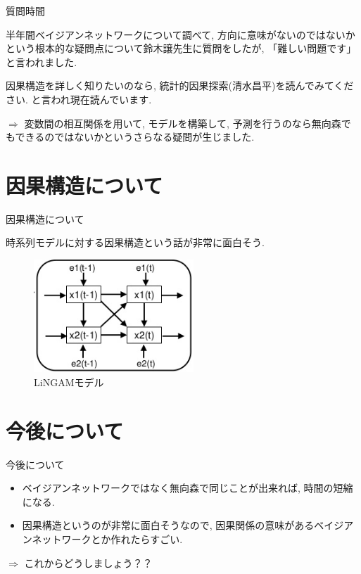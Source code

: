 \documentclass[dvipdfmx]{beamer}
\begin{document}
\begin{frame}{質問時間}

半年間ベイジアンネットワークについて調べて, 方向に意味がないのではないかという根本的な疑問点について鈴木譲先生に質問をしたが, 「難しい問題です」と言われました. 

\vspace{0.2cm}
因果構造を詳しく知りたいのなら, 統計的因果探索(清水昌平)を読んでみてください. と言われ現在読んでいます.

\vspace{0.2cm}
$\Rightarrow$ 変数間の相互関係を用いて, モデルを構築して, 予測を行うのなら無向森でもできるのではないかというさらなる疑問が生じました.

\end{frame}

\section{因果構造について}
\begin{frame}{因果構造について}

時系列モデルに対する因果構造という話が非常に面白そう. 

\begin{figure}[H]
\begin{center}
\includegraphics[width=60mm]{data/sample3.png}
\caption{LiNGAMモデル}
\label{TAN}
\end{center}
\end{figure}

\end{frame}

\section{今後について}
\begin{frame}{今後について}

\begin{itemize}

\item ベイジアンネットワークではなく無向森で同じことが出来れば, 時間の短縮になる.

\vspace{0.3cm}

\item 因果構造というのが非常に面白そうなので, 因果関係の意味があるベイジアンネットワークとか作れたらすごい.

\end{itemize}

\vspace{0.3cm}

\hspace{0.3cm} $\Rightarrow$ これからどうしましょう？？

\end{frame}
\end{document}
